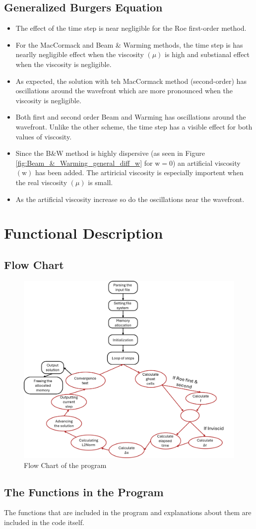 \documentclass[11pt, a4paper]{article}
\begin{document}
\subsection{Generalized Burgers Equation}
\begin{itemize}
    \item The effect of the time step is near negligible for the Roe first-order method.
    \item For the MacCormack and Beam $\&$ Warming methods, the time step is has nearlly negligible effect when the viscosity $\left(\mu\right)$ is high and substianal effect when the viscosity is negligible.
    \item As expected, the solution with teh MacCormack method (second-order) has oscillations around the wavefront which are more pronounced when the viscosity is negligible.
    \item Both first and second order Beam and Warming has oscillations around the wavefront. Unlike the other scheme, the time step has a visible effect for both values of viscosity.
    \item Since the B$\&$W method is highly dispersive (as seen in Figure \ref{fig:Beam_&_Warming_general_diff_w} for $\mathrm{w}=0$) an artificial viscosity $\left(\mathrm{w}\right)$ has been added. The artiricial viscosity is especially importent when the real viscosity $\left(\mu\right)$ is small. 
    \item As the artificial viscosity increase so do the oscillations near the wavefront.
\end{itemize}

\appendix
\section{Functional Description}
\subsection{Flow Chart}
\begin{figure}[H]
    \centering
    \includegraphics[width=\textwidth]{images/flow char.png}
    \caption{Flow Chart of the program}
    \label{fig:flow_chart}
\end{figure}
\subsection{The Functions in the Program}
The functions that are included in the program and explanations about them are included in the code itself.
\end{document}
